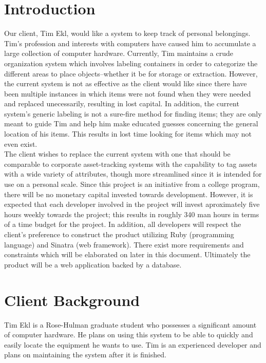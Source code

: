 \documentclass{article}
\begin{document}
\section{Introduction}
Our client, Tim Ekl, would like a system to keep track of personal belongings. Tim's profession and interests with computers have caused him to accumulate a large collection of computer hardware. Currently, Tim maintains a crude organization system which involves labeling containers in order to categorize the different areas to place objects--whether it be for storage or extraction. However, the current system is not as effective as the client would like since there have been multiple instances in which items were not found when they were needed and replaced unecessarily, resulting in lost capital. In addition, the current system's generic labeling is not a sure-fire method for finding items; they are only meant to guide Tim and help him make educated guesses concerning the general location of his items. This results in lost time looking for items which may not even exist.\\
The client wishes to replace the current system with one that should be comparable to corporate asset-tracking systems with the capability to tag assets with a wide variety of attributes, though more streamlined since it is intended for use on a personal scale. Since this project is an initiative from a college program, there will be no monetary capital invested towards development. However, it is expected that each developer involved in the project will invest aproximately five hours weekly towards the project; this results in roughly 340 man hours in terms of a time budget for the project. In addition, all developers will respect the client's preference to construct the product utilizing Ruby (programming language) and Sinatra (web framework). There exist more requirements and constraints which will be elaborated on later in this document. Ultimately the product will be a web application backed by a database.

\section{Client Background}
Tim Ekl is a Rose-Hulman graduate student who possesses a significant amount of computer hardware.  He plans on using this system to be able to quickly and easily locate the equipment he wants to use.  Tim is an experienced developer and plans on maintaining the system after it is finished.  
\end{document}
